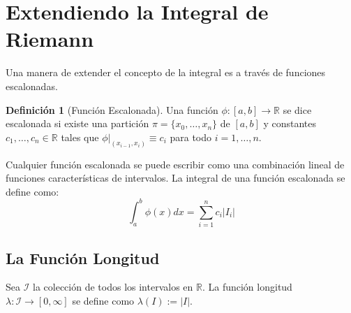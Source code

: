 \documentclass[11pt]{article}
\theoremstyle{definition} %
\newtheorem{definition}[theorem]{Definición}
\begin{document}
\section{Extendiendo la Integral de Riemann}
\label{sec:extending-riemann}

Una manera de extender el concepto de la integral es a través de funciones escalonadas.

\begin{definition}[Función Escalonada]
Una función $\phi:[a,b] \rightarrow \mathbb{R}$ se dice escalonada si existe una partición $\pi = \{x_0, \dots, x_n\}$ de $[a,b]$ y constantes $c_1, \dots, c_n \in \mathbb{R}$ tales que $\phi|_{(x_{i-1}, x_i)} \equiv c_i$ para todo $i=1,\dots,n$.
\end{definition}

Cualquier función escalonada se puede escribir como una combinación lineal de funciones características de intervalos. La integral de una función escalonada se define como:
$$ \int_{a}^{b} \phi(x)dx = \sum_{i=1}^{n} c_i |I_i| $$

\subsection{La Función Longitud}
\label{sec:length-function}

Sea $\mathcal{I}$ la colección de todos los intervalos en $\mathbb{R}$. La función longitud $\lambda:\mathcal{I} \rightarrow [0, \infty]$ se define como $\lambda(I) := |I|$.
\end{document}
